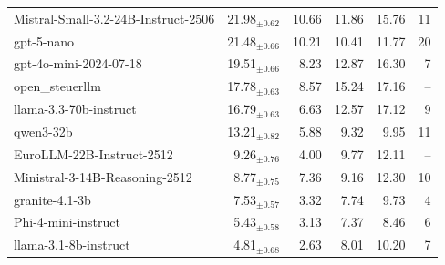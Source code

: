 \begin{tabular}{lrrrrr}
Mistral-Small-3.2-24B-Instruct-2506 & 21.98$_{\pm0.62}$ & 10.66 & 11.86 & 15.76 & 11 \\
gpt-5-nano & 21.48$_{\pm0.66}$ & 10.21 & 10.41 & 11.77 & 20 \\
gpt-4o-mini-2024-07-18 & 19.51$_{\pm0.66}$ & 8.23 & 12.87 & 16.30 & 7 \\
open\_steuerllm & 17.78$_{\pm0.63}$ & 8.57 & 15.24 & 17.16 & -- \\
llama-3.3-70b-instruct & 16.79$_{\pm0.63}$ & 6.63 & 12.57 & 17.12 & 9 \\
qwen3-32b & 13.21$_{\pm0.82}$ & 5.88 & 9.32 & 9.95 & 11 \\
EuroLLM-22B-Instruct-2512 & 9.26$_{\pm0.76}$ & 4.00 & 9.77 & 12.11 & -- \\
Ministral-3-14B-Reasoning-2512 & 8.77$_{\pm0.75}$ & 7.36 & 9.16 & 12.30 & 10 \\
granite-4.1-3b & 7.53$_{\pm0.57}$ & 3.32 & 7.74 & 9.73 & 4 \\
Phi-4-mini-instruct & 5.43$_{\pm0.58}$ & 3.13 & 7.37 & 8.46 & 6 \\
llama-3.1-8b-instruct & 4.81$_{\pm0.68}$ & 2.63 & 8.01 & 10.20 & 7 \\
\bottomrule
\end{tabular}
